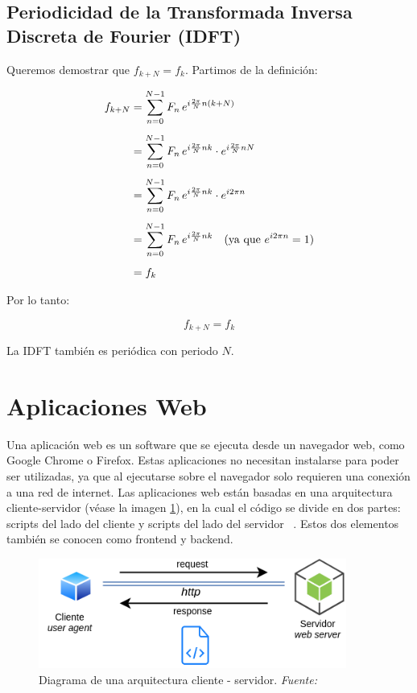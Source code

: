 \subsection{Periodicidad de la Transformada Inversa Discreta de Fourier (IDFT)}

Queremos demostrar que \( f_{k+N} = f_k \). Partimos de la definición:

\begin{align}
	f_{k+N} &= \sum_{n=0}^{N-1} F_n \, e^{i \frac{2\pi}{N} n(k+N)} \\[1ex]
	&= \sum_{n=0}^{N-1} F_n \, e^{i \frac{2\pi}{N} nk} \cdot e^{i \frac{2\pi}{N} nN} \\[1ex]
	&= \sum_{n=0}^{N-1} F_n \, e^{i \frac{2\pi}{N} nk} \cdot e^{i 2\pi n} \\[1ex]
	&= \sum_{n=0}^{N-1} F_n \, e^{i \frac{2\pi}{N} nk} \quad \text{(ya que \( e^{i 2\pi n} = 1 \))} \\[1ex]
	&= f_k
\end{align}

Por lo tanto:

\[
f_{k+N} = f_k
\]

La IDFT también es periódica con periodo \( N \).


\section{Aplicaciones Web}
Una aplicación web es un software que se ejecuta desde un navegador web, como Google Chrome o Firefox. Estas aplicaciones no necesitan instalarse para poder ser utilizadas, ya que al ejecutarse sobre el navegador solo requieren una conexión a una red de internet. Las aplicaciones web están basadas en una arquitectura cliente-servidor (véase la imagen \ref{fig:cliente-servidor}), en la cual el código se divide en dos partes: scripts del lado del cliente y scripts del lado del servidor ~\cite{apliacionWebAmazon}. Estos dos elementos también se conocen como frontend y backend.

\begin{figure}[h]
	\centering	 
	\includegraphics[width=0.9\textwidth]{img/chapter03/ui-web-arquitectura.png}
	\caption[Diagrama de una arquitectura cliente - servidor]{Diagrama de una arquitectura cliente - servidor. \textit{Fuente: ~\cite{uqbar-wiki-web}}}
	\label{fig:cliente-servidor}  %
\end{figure}


